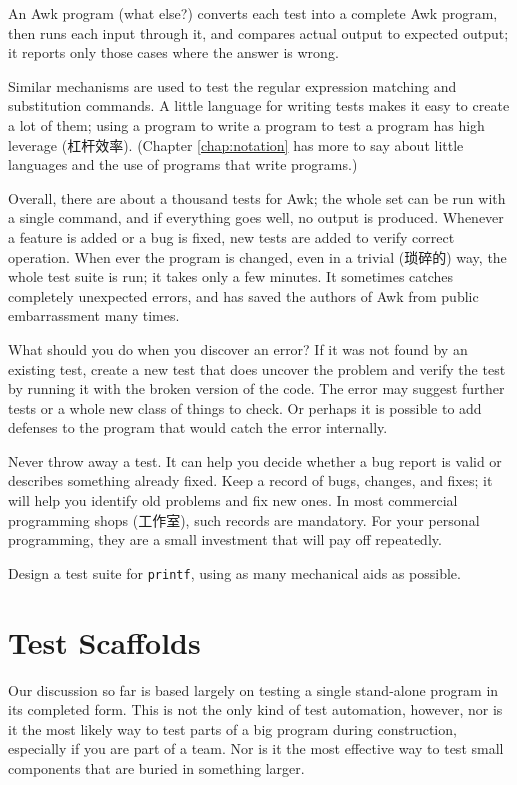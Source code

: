 An Awk program (what else?) converts each test into a complete Awk program,
then runs each input through it, and compares actual output to expected
output; it reports only those cases where the answer is wrong.

Similar mechanisms are used to test the regular expression matching and
substitution commands. A little language for writing tests makes it easy to
create a lot of them; using a program to write a program to test a program
has high leverage (杠杆效率). (Chapter \ref{chap:notation} has more to say
about little languages and the use of programs that write programs.)

Overall, there are about a thousand tests for Awk; the whole set can be run
with a single command, and if everything goes well, no output is produced.
Whenever a feature is added or a bug is fixed, new tests are added to
verify correct operation. When ever the program is changed, even in a
trivial (琐碎的) way, the whole test suite is run; it takes only a few
minutes. It sometimes catches completely unexpected errors, and has saved
the authors of Awk from public embarrassment many times.

What should you do when you discover an error? If it was not found by an
existing test, create a new test that does uncover the problem and verify
the test by running it with the broken version of the code. The error may
suggest further tests or a whole new class of things to check. Or perhaps
it is possible to add defenses to the program that would catch the error
internally.

Never throw away a test. It can help you decide whether a bug report is
valid or describes something already fixed. Keep a record of bugs, changes,
and fixes; it will help you identify old problems and fix new ones. In most
commercial programming shops (工作室), such records are mandatory. For your
personal programming, they are a small investment that will pay off
repeatedly.

\begin{exercise}
    Design a test suite for \texttt{printf}, using as many mechanical aids
    as possible.
\end{exercise}

\section{Test Scaffolds}
\label{sec:test_scaffolds}

Our discussion so far is based largely on testing a single stand-alone
program in its completed form. This is not the only kind of test
automation, however, nor is it the most likely way to test parts of a big
program during construction, especially if you are part of a team. Nor is
it the most effective way to test small components that are buried in
something larger.

